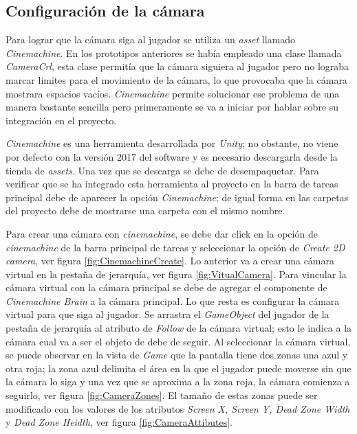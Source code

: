 \subsection{Configuración de la cámara}\label{Cinemachine}
Para lograr que la cámara siga al jugador se utiliza un \textit{asset} llamado 
\textit{Cinemachine}. En los prototipos anteriores se había empleado una clase 
llamada \textit{CameraCrl}, esta clase permitía que la cámara siguiera al 
jugador pero no lograba marcar limites para el movimiento de la cámara, lo que 
provocaba que la cámara mostrara espacios vacíos. \textit{Cinemachine} permite 
solucionar ese problema de una manera bastante sencilla pero primeramente se va 
a iniciar por hablar sobre su integración en el proyecto.
\\
\par
\textit{Cinemachine} es una herramienta desarrollada por \textit{Unity}; no 
obstante, no viene por defecto con la versión 2017 del software y es necesario 
descargarla desde la tienda de \textit{assets}. Una vez que se descarga se debe 
de desempaquetar. Para verificar que se ha integrado esta herramienta al proyecto 
en la barra de tareas principal debe de aparecer la opción \textit{Cinemachine}; 
de igual forma en las carpetas del proyecto debe de mostrarse una carpeta con 
el mismo nombre. 
\\
\par
Para crear una cámara con \textit{cinemachine}, se debe dar click en la opción de \textit{cinemachine} de la barra principal de tareas y seleccionar la opción de \textit{Create 2D camera}, ver figura \ref{fig:CinemachineCreate}. Lo anterior va a crear una cámara virtual en la pestaña de jerarquía, ver figura \ref{fig:VitualCamera}. Para vincular la cámara virtual con la cámara principal se debe de agregar el componente de \textit{Cinemachine Brain} a la cámara principal. Lo que resta es configurar la cámara virtual para que siga al jugador. Se arrastra el \textit{GameObject} del jugador de la pestaña de jerarquía al atributo de \textit{Follow} de la cámara virtual; esto le indica a la cámara cual va a ser el objeto de debe de seguir. Al seleccionar la cámara virtual, se puede observar en la vista de \textit{Game} que la pantalla tiene dos zonas una azul y otra roja; la zona azul delimita el área en la que el jugador puede moverse sin que la cámara lo siga y una vez que se aproxima a la zona roja, la cámara comienza a seguirlo, ver figura \ref{fig:CameraZones}. El tamaño de estas zonas puede ser modificado con los valores de los atributos \textit{Screen X, Screen Y, Dead Zone Width} y \textit{Dead Zone Heidth}, ver figura \ref{fig:CameraAttibutes}. 
